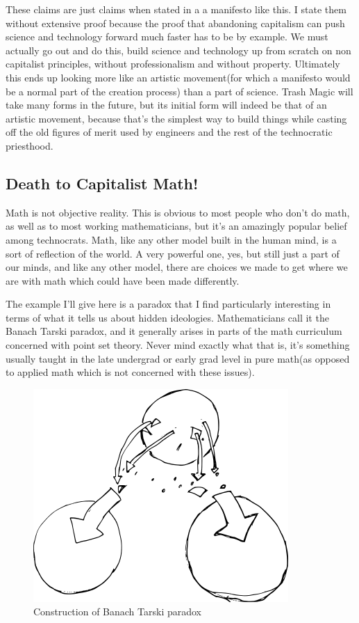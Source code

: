 These claims are just claims when stated in a a manifesto like this. I
state them without extensive proof because the proof that abandoning
capitalism can push science and technology forward much faster has to be
by example. We must actually go out and do this, build science and
technology up from scratch on non capitalist principles, without
professionalism and without property. Ultimately this ends up looking
more like an artistic movement(for which a manifesto would be a normal
part of the creation process) than a part of science. Trash Magic will
take many forms in the future, but its initial form will indeed be that
of an artistic movement, because that's the simplest way to build things
while casting off the old figures of merit used by engineers and the
rest of the technocratic priesthood.

\subsection{Death to Capitalist Math!}\label{death-to-capitalist-math}

Math is not objective reality. This is obvious to most people who don't
do math, as well as to most working mathematicians, but it's an
amazingly popular belief among technocrats. Math, like any other model
built in the human mind, is a sort of reflection of the world. A very
powerful one, yes, but still just a part of our minds, and like any
other model, there are choices we made to get where we are with math
which could have been made differently.

The example I'll give here is a paradox that I find particularly
interesting in terms of what it tells us about hidden ideologies.
Mathematicians call it the Banach Tarski paradox, and it generally
arises in parts of the math curriculum concerned with point set theory.
Never mind exactly what that is, it's something usually taught in the
late undergrad or early grad level in pure math(as opposed to applied
math which is not concerned with these issues).

\begin{figure}[htbp]
\centering
\includegraphics{images/banachtarski1.png}
\caption{Construction of Banach Tarski paradox}
\end{figure}

